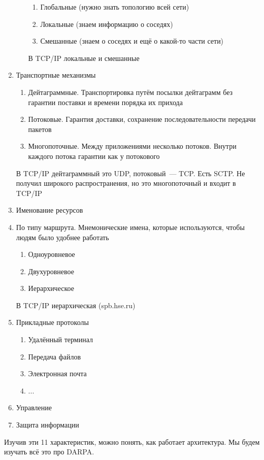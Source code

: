 \begin{enumerate}
\begin{enumerate}
\begin{enumerate}
            \item Глобальные (нужно знать топологию всей сети)
            \item Локальные (знаем информацию о соседях)
            \item Смешанные (знаем о соседях и ещё о какой-то части сети)
        \end{enumerate}
        В TCP/IP локальные и смешанные
    \end{enumerate}
    \item Транспортные механизмы
    \begin{enumerate}
        \item Дейтаграммные. Транспортировка путём посылки дейтаграмм без гарантии поставки и времени порядка их прихода
        \item Потоковые. Гарантия доставки, сохранение последовательности передачи пакетов
        \item Многопоточные. Между приложениями несколько потоков. Внутри каждого потока гарантии как у потокового
    \end{enumerate}
    В TCP/IP дейтаграммный это UDP, потоковый~--- TCP. Есть SCTP. Не получил широкого распространения, но это многопоточный и входит в TCP/IP
    \item Именование ресурсов
    \item По типу маршрута. Мнемонические имена, которые используются, чтобы людям было удобнее работать
    \begin{enumerate}
        \item Одноуровневое
        \item Двухуровневое
        \item Иерархическое
    \end{enumerate}   
    В TCP/IP иерархическая (spb.hse.ru)
    \item Прикладные протоколы
    \begin{enumerate}
        \item Удалённый терминал
        \item Передача файлов
        \item Электронная почта
        \item ...
    \end{enumerate}
    \item Управление
    \item Защита информации
\end{enumerate}

Изучив эти 11 характеристик, можно понять, как работает архитектура. Мы будем изучать всё это про DARPA.

